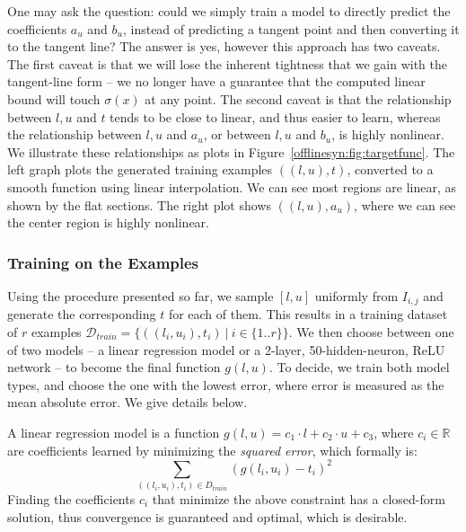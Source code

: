 One may ask the question: could we simply train a model to directly predict the
coefficients $ a_u $ and $ b_u $, instead of predicting a tangent point and
then converting it to the tangent line? The answer is yes, however this
approach has two caveats. The first caveat is that we will lose the inherent
tightness that we gain with the tangent-line form -- we no longer have a
guarantee that the computed linear bound will touch $ \sigma(x) $ at
any point. The second caveat is  that the relationship between $ l, u $ and $ t $
tends to be close to linear, and thus easier to learn, whereas the relationship
between $ l, u$ and  $a_u $, or between $ l, u$ and $ b_u $,  is highly nonlinear.
We illustrate these
relationships as plots in Figure~\ref{offlinesyn:fig:targetfunc}. The left graph
plots the
generated training examples $ ((l, u), t) $, converted to a smooth function
using linear interpolation. We can see most regions are linear, as shown by the
flat sections. The right plot shows $ ((l, u), a_u) $, where we can see
the center region is highly nonlinear.

\subsubsection{Training on the Examples}
Using the procedure presented so far, we sample $ [l, u] $ uniformly from $
I_{i,j} $ and generate the corresponding $ t $ for each of them. This results
in a training dataset of $ r $ examples $ \mathcal{D}_{train} = \{ ((l_i, u_i),
t_i) ~|~ i \in \{1..r\} \} $. We then choose between one of two models -- a
linear regression model or a 2-layer, 50-hidden-neuron, ReLU network -- to become
the final function $ g(l, u) $. To decide, we train both model types, and choose the one
with the lowest error, where error is measured as the mean absolute error. We give
details below.

A linear regression model is a function $ g(l, u) = c_1 \cdot l +
c_2 \cdot u + c_3 $, where $ c_i \in \mathbb{R} $ are coefficients
learned by minimizing the \textit{squared error}, which formally is:
\begin{equation}\label{offlinesyn:eq:sqerror}
	\sum_{((l_i, u_i), t_i) \in D_{train}} (g(l_i, u_i) - t_i)^2
\end{equation}
Finding the coefficients $ c_i $ that minimize the above constraint has a closed-form
solution, thus convergence is guaranteed and optimal, which is desirable.

